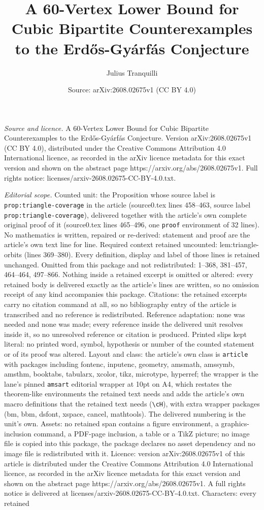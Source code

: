 \documentclass[10pt,a4paper]{amsart}
\title[A 60-Vertex Lower Bound for Cubic Bipartite Counterexamples ]{A 60-Vertex Lower Bound for Cubic Bipartite Counterexamples to the Erd\H{o}s-Gy\'arf\'as Conjecture}
\author{Julius Tranquilli}
\date{Source: arXiv:2608.02675v1 (CC BY 4.0)}
\begin{document}
\maketitle

\noindent\emph{Source and licence.} A 60-Vertex Lower Bound for Cubic Bipartite Counterexamples to the Erd\H{o}s-Gy\'arf\'as Conjecture. Version arXiv:2608.02675v1 (CC BY 4.0), distributed under the Creative Commons Attribution 4.0 International licence, as recorded in the arXiv licence metadata for this exact version and shown on the abstract page https://arxiv.org/abs/2608.02675v1. Full rights notice: licenses/arxiv-2608.02675-CC-BY-4.0.txt.\par\smallskip

\noindent\textit{Editorial scope.} Counted unit: the Proposition whose source label is \texttt{prop:triangle-coverage} in the article (source0.tex lines 458--463, source label \texttt{prop:triangle-coverage}), delivered together with the article's own complete original proof of it (source0.tex lines 465--496, one \texttt{proof} environment of 32 lines). No mathematics is written, repaired or re-derived: statement and proof are the article's own text line for line. Required context retained uncounted: lem:triangle-orbits (lines 369--380). Every definition, display and label of those lines is retained unchanged. Omitted from this package and not redistributed: 1--368, 381--457, 464--464, 497--866. Nothing inside a retained excerpt is omitted or altered: every retained body is delivered exactly as the article's lines are written, so no omission receipt of any kind accompanies this package. Citations: the retained excerpts carry no citation command at all, so no bibliography entry of the article is transcribed and no reference is redistributed. Reference adaptation: none was needed and none was made; every reference inside the delivered unit resolves inside it, so no unresolved reference or citation is produced. Printed slips kept literal: no printed word, symbol, hypothesis or number of the counted statement or of its proof was altered. Layout and class: the article's own class is \texttt{article} with packages including fontenc, inputenc, geometry, amsmath, amssymb, amsthm, booktabs, tabularx, xcolor, tikz, microtype, hyperref; the wrapper is the lane's pinned \texttt{amsart} editorial wrapper at 10pt on A4, which restates the theorem-like environments the retained text needs and adds the article's own macro definitions that the retained text needs (\texttt{\textbackslash cH}), with extra wrapper packages (bm, bbm, dsfont, xspace, cancel, mathtools). The delivered numbering is the unit's own. Assets: no retained span contains a figure environment, a graphics-inclusion command, a PDF-page inclusion, a table or a TikZ picture; no image file is copied into this package, the package declares no asset dependency and no image file is redistributed with it. Licence: version arXiv:2608.02675v1 of this article is distributed under the Creative Commons Attribution 4.0 International licence, as recorded in the arXiv licence metadata for this exact version and shown on the abstract page https://arxiv.org/abs/2608.02675v1. A full rights notice is delivered at licenses/arxiv-2608.02675-CC-BY-4.0.txt. Characters: every retained 
\end{document}
